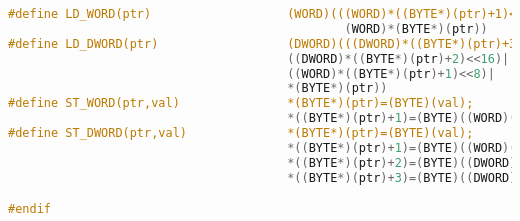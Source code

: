 \begin{lstlisting}[language={C}, caption={FAT.H}]
#define	LD_WORD(ptr)                   (WORD)(((WORD)*((BYTE*)(ptr)+1)<<8)|
                                               (WORD)*(BYTE*)(ptr))
#define	LD_DWORD(ptr)                  (DWORD)(((DWORD)*((BYTE*)(ptr)+3)<<24)|
                                       ((DWORD)*((BYTE*)(ptr)+2)<<16)|
                                       ((WORD)*((BYTE*)(ptr)+1)<<8)|
                                       *(BYTE*)(ptr))
#define	ST_WORD(ptr,val)               *(BYTE*)(ptr)=(BYTE)(val); 
                                       *((BYTE*)(ptr)+1)=(BYTE)((WORD)(val)>>8)
#define	ST_DWORD(ptr,val)              *(BYTE*)(ptr)=(BYTE)(val); 
                                       *((BYTE*)(ptr)+1)=(BYTE)((WORD)(val)>>8);
                                       *((BYTE*)(ptr)+2)=(BYTE)((DWORD)(val)>>16);
                                       *((BYTE*)(ptr)+3)=(BYTE)((DWORD)(val)>>24)

#endif
\end{lstlisting}
